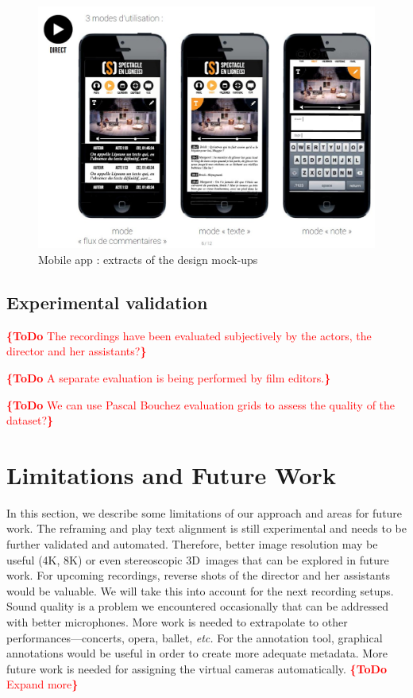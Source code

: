 \documentclass[conference]{IEEEtran}
\newcommand{\todo}[1]{\noindent\textcolor{red}{{\bf \{ToDo} #1{\bf \}}}}
\begin{document}
\begin{figure}[htb!]
  \centering
  \includegraphics[width=\columnwidth]{mobileapp}
  \caption{Mobile app : extracts of the design mock-ups}
  \label{fig:mobileapp}
\end{figure}


\subsection{Experimental validation}
\todo{The recordings have been evaluated subjectively by the actors, the director and her assistants?}

\todo{A separate evaluation is being performed by film editors.}

\todo{We can use Pascal Bouchez evaluation grids to assess the quality of the dataset?}


\section{Limitations and Future  Work}

In this section, we describe some limitations of our approach and areas for future work.
The reframing and play text alignment is still experimental
and needs to be further validated and automated.
Therefore, better image resolution may be useful (4K, 8K)
or even stereoscopic 3D~images that can be explored in future work.
For upcoming recordings, reverse shots of the director and her assistants would be valuable.
We will take this into account for the next recording setups.
Sound quality is a problem we encountered occasionally that can be addressed with better microphones.
More work is needed to extrapolate to other performances---concerts, opera, ballet, \emph{etc.}
For the annotation tool, graphical annotations would be useful
in order to create more adequate metadata.
More future work is needed for assigning the virtual cameras automatically.
\todo{Expand more}
\end{document}
